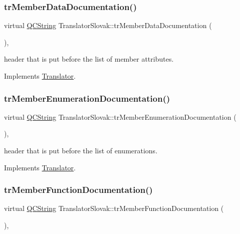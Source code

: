 \subsubsection{\texorpdfstring{trMemberDataDocumentation()}{trMemberDataDocumentation()}}
{\footnotesize\ttfamily virtual \mbox{\hyperlink{class_q_c_string}{Q\+C\+String}} Translator\+Slovak\+::tr\+Member\+Data\+Documentation (\begin{DoxyParamCaption}{ }\end{DoxyParamCaption})\hspace{0.3cm}{\ttfamily [inline]}, {\ttfamily [virtual]}}

header that is put before the list of member attributes. 

Implements \mbox{\hyperlink{class_translator}{Translator}}.

\mbox{\label{class_translator_slovak_af05760ae867cbacf2097d6eb86c0ca8d}} 
\subsubsection{\texorpdfstring{trMemberEnumerationDocumentation()}{trMemberEnumerationDocumentation()}}
{\footnotesize\ttfamily virtual \mbox{\hyperlink{class_q_c_string}{Q\+C\+String}} Translator\+Slovak\+::tr\+Member\+Enumeration\+Documentation (\begin{DoxyParamCaption}{ }\end{DoxyParamCaption})\hspace{0.3cm}{\ttfamily [inline]}, {\ttfamily [virtual]}}

header that is put before the list of enumerations. 

Implements \mbox{\hyperlink{class_translator}{Translator}}.

\mbox{\label{class_translator_slovak_a6cf37579edda4949016b07e25d39768b}} 
\subsubsection{\texorpdfstring{trMemberFunctionDocumentation()}{trMemberFunctionDocumentation()}}
{\footnotesize\ttfamily virtual \mbox{\hyperlink{class_q_c_string}{Q\+C\+String}} Translator\+Slovak\+::tr\+Member\+Function\+Documentation (\begin{DoxyParamCaption}{ }\end{DoxyParamCaption})\hspace{0.3cm}{\ttfamily [inline]}, {\ttfamily [virtual]}}

